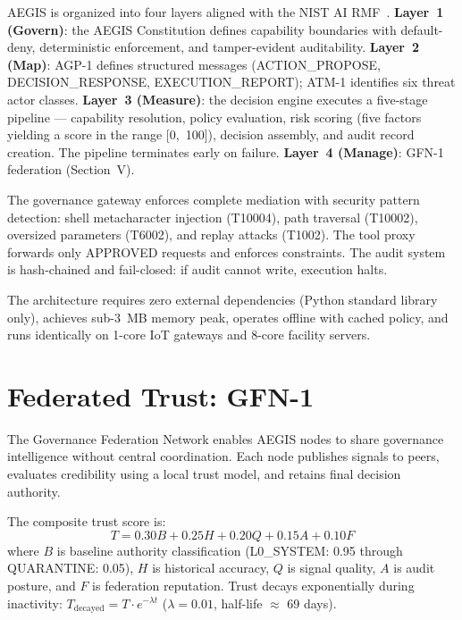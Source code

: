 \documentclass[journal]{IEEEtran}
\begin{document}
AEGIS is organized into four layers aligned with the NIST AI RMF~\cite{nist_airmf}. \textbf{Layer~1 (Govern)}: the AEGIS Constitution defines capability boundaries with default-deny, deterministic enforcement, and tamper-evident auditability. \textbf{Layer~2 (Map)}: AGP-1 defines structured messages (ACTION\_PROPOSE, DECISION\_RESPONSE, EXECUTION\_REPORT); ATM-1 identifies six threat actor classes. \textbf{Layer~3 (Measure)}: the decision engine executes a five-stage pipeline --- capability resolution, policy evaluation, risk scoring (five factors yielding a score in the range [0,~100]), decision assembly, and audit record creation. The pipeline terminates early on failure. \textbf{Layer~4 (Manage)}: GFN-1 federation (Section~V).

The governance gateway enforces complete mediation with security pattern detection: shell metacharacter injection (T10004), path traversal (T10002), oversized parameters (T6002), and replay attacks (T1002). The tool proxy forwards only APPROVED requests and enforces constraints. The audit system is hash-chained and fail-closed: if audit cannot write, execution halts.

The architecture requires zero external dependencies (Python standard library only), achieves sub-3~MB memory peak, operates offline with cached policy, and runs identically on 1-core IoT gateways and 8-core facility servers.

\section{Federated Trust: GFN-1}

The Governance Federation Network enables AEGIS nodes to share governance intelligence without central coordination. Each node publishes signals to peers, evaluates credibility using a local trust model, and retains final decision authority.

The composite trust score is:
\begin{equation}
T = 0.30B + 0.25H + 0.20Q + 0.15A + 0.10F
\label{eq:trust}
\end{equation}
where $B$ is baseline authority classification (L0\_SYSTEM: 0.95 through QUARANTINE: 0.05), $H$ is historical accuracy, $Q$ is signal quality, $A$ is audit posture, and $F$ is federation reputation. Trust decays exponentially during inactivity: $T_{\text{decayed}} = T \cdot e^{-\lambda t}$ ($\lambda = 0.01$, half-life $\approx$ 69 days).
\end{document}
